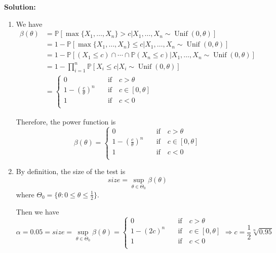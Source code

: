\documentclass[13pt]{article}
\theoremstyle{definition}
\newenvironment{solution}
{\color{C2}\begin{framed}\begingroup\textbf{Solution:} }
  {\endgroup\end{framed}}
\theoremstyle{remark}
\newcommand{\PP}{\mathbb{P}}
\begin{document}
\begin{solution}
\begin{enumerate}[label=(\alph*),topsep=0pt]
    \item We have \begin{align*}\beta(\theta) &= \PP[\max\{X_1, \ldots, X_n\} > c | X_1, \ldots, X_n \sim \operatorname{Unif}(0,\theta)]\\
    &= 1-\PP[\max\{X_1, \ldots, X_n\} \le c | X_1, \ldots, X_n \sim \operatorname{Unif}(0,\theta)]\\
    &= 1-\PP[(X_1\le c)\cap \cdots \cap\PP(X_n\le c) | X_1, \ldots, X_n \sim \operatorname{Unif}(0,\theta)]\\
    &= 1-\prod_{i=1}^n\PP[X_i\le c| X_i\sim \operatorname{Unif}(0,\theta)]\\
    &= \begin{cases}
    0 \quad & \text{if}\quad c>\theta\\
    1-\left(\frac{c}{\theta}\right)^n \quad & \text{if}\quad c \in [0, \theta]\\
    1 \quad & \text{if}\quad c<0\\
    \end{cases}
    \end{align*}
    
    Therefore, the power function is
    \[
    \beta(\theta)= \begin{cases}
    0 \quad & \text{if}\quad c>\theta\\
    1-\left(\frac{c}{\theta}\right)^n \quad & \text{if}\quad c \in [0, \theta]\\
    1 \quad & \text{if}\quad c<0\\
    \end{cases}
    \]
    \item By definition, the size of the test is 
    \[size = \sup_{\theta\in\Theta_0}\beta(\theta)\]
    where $\Theta_0 = \{\theta: 0\le \theta\le \frac{1}{2}\}$.
    
    Then we have
    \[
    \alpha =0.05 = size = \sup_{\theta\in\Theta_0}\beta(\theta) = \begin{cases}
    0 \quad & \text{if}\quad c>\theta\\
    1-\left(2c\right)^n \quad & \text{if}\quad c \in [0, \theta]\\
    1 \quad & \text{if}\quad c<0\\
    \end{cases} \Longrightarrow c = \frac{1}{2}\sqrt[n]{0.95}
    \]
    

\end{enumerate}
\end{solution}
\end{document}
